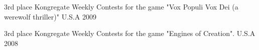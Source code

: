 



\begin{cvhonors}

  \cvhonor
    {3rd place} %
    {Kongregate Weekly Contests for the game "Vox Populi Vox Dei (a werewolf thriller)"} %
    {U.S.A} %
    {2009} %

  \cvhonor
    {3rd place} %
    {Kongregate Weekly Contests for the game "Engines of Creation".} %
    {U.S.A} %
    {2008} %
\end{cvhonors}

